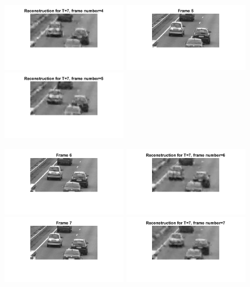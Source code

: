 \documentclass[a4paper,11pt]{article}
\numberwithin{definition}{section}
\numberwithin{mytheorem}{subsection}
\begin{document}
\begin{figure}[H]
    \includegraphics[width=200px]{"Reconstruction- T=7, frame number=4.png"}
    \includegraphics[width=200px]{"Frame 5.png"}
    \includegraphics[width=200px]{"Reconstruction- T=7, frame number=5.png"}

\end{figure}
\begin{figure}[H]
    \centering
    \includegraphics[width=200px]{"Frame 6.png"}
    \includegraphics[width=200px]{"Reconstruction- T=7, frame number=6.png"}
    \includegraphics[width=200px]{"Frame 7.png"}
    \includegraphics[width=200px]{"Reconstruction- T=7, frame number=7.png"}
\end{figure}
\end{document}
